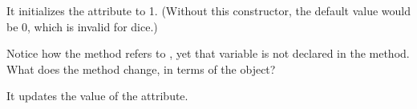 \begin{answer}
It initializes the  attribute to 1.
(Without this constructor, the default value would be 0, which is invalid for dice.)
\end{answer}


\Q Notice how the  method refers to , yet that variable is not declared in the method. What does the  method change, in terms of the  object?

\begin{answer}[3em]
It updates the value of the  attribute.
\end{answer}


%

